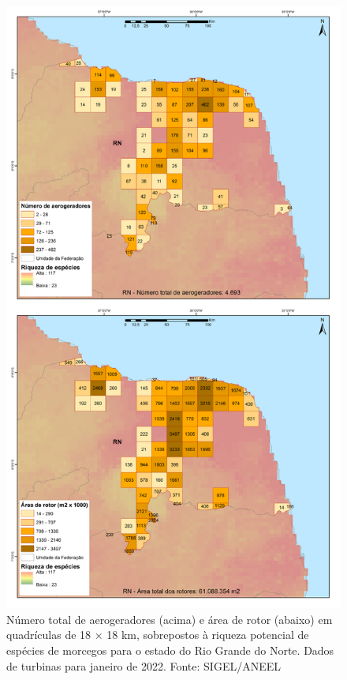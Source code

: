 \documentclass[
  oneside]{scrbook}
\begin{document}
\begin{figure}[H]

{\centering \includegraphics[width=0.7\linewidth]{imagens/cap09/Figura_9.8} 

}

\caption{Número total de aerogeradores (acima) e área de rotor (abaixo) em quadrículas de 18 × 18 km, sobrepostos à riqueza potencial de espécies de morcegos para o estado do Rio Grande do Norte. Dados de turbinas para janeiro de 2022. Fonte: SIGEL/ANEEL}\label{fig:73}
\end{figure}
\end{document}
